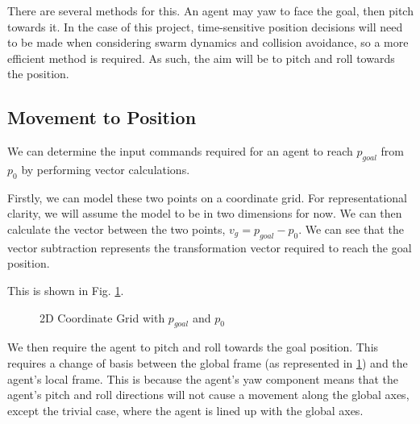 \documentclass[12pt]{article}
\begin{document}
There are several methods for this. An agent may yaw to face the goal, then pitch towards it. In the case of this project, time-sensitive position decisions will need to be made when considering swarm dynamics and collision avoidance, so a more efficient method is required. As such, the aim will be to pitch and roll towards the position.

\subsection{Movement to Position}
We can determine the input commands required for an agent to reach $p_{goal}$ from $p_0$ by performing vector calculations. 

Firstly, we can model these two points on a coordinate grid. For representational clarity, we will assume the model to be in two dimensions for now. We can then calculate the vector between the two points, $v_g = p_{goal} - p_0$. We can see that the vector subtraction represents the transformation vector required to reach the goal position.

This is shown in Fig. \ref{fig:2d-coords}.

\begin{figure}[H]
    \centering
    \caption{2D Coordinate Grid with $p_{goal}$ and $p_{0}$}
    \label{fig:2d-coords}
\end{figure}

We then require the agent to pitch and roll towards the goal position. This requires a change of basis between the global frame (as represented in \ref{fig:2d-coords}) and the agent's local frame. This is because the agent's yaw component means that the agent's pitch and roll directions will not cause a movement along the global axes, except the trivial case, where the agent is lined up with the global axes.
\end{document}
